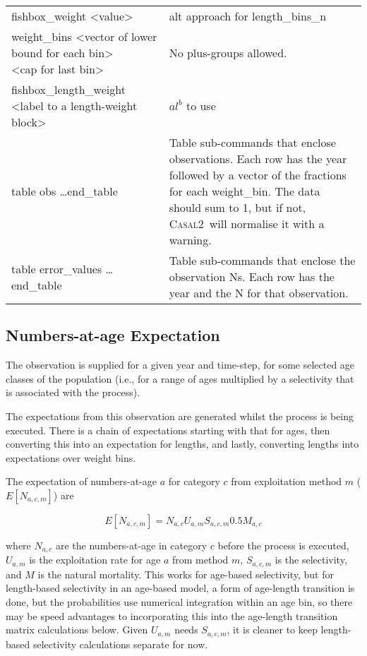 \documentclass[a4paper,11pt,twoside,pdftex,draft]{article}
\newcommand{\CNAME}{\textsc{Casal2}}
\begin{document}
\begin{table}
\begin{tabular}{ll}
fishbox\_weight <value>& alt approach for length\_bins\_n\\

\parbox[t]{0.5\linewidth}{weight\_bins <vector of lower bound for each bin>
	\textcolor{white}{.}~~~~~~ <cap for last bin>}  & No plus-groups allowed.\\

fishbox\_length\_weight <label to a length-weight block>& $al^{b}$ to use\\


table obs   \dots end\_table &  \parbox[t]{0.3\linewidth}{Table sub-commands that enclose observations.
	Each row has the year followed by a vector of the fractions for each weight\_bin.
	The data should sum to 1, but if not, \CNAME~will normalise it with a warning.}\\



table error\_values \dots end\_table   &  \parbox[t]{0.3\linewidth}{Table sub-commands that enclose the observation Ns.
	Each row has the year and the N for that observation.}

\end{tabular}
\end{table}


\subsection{Numbers-at-age Expectation}

The observation is supplied for a given year and time-step, for some selected age classes of the population (i.e., for a range of ages multiplied by a selectivity that is associated with the process).

The expectations from this observation are generated whilst the process is being executed. There is a chain of expectations starting with that for ages, then converting this into an expectation for lengths, and lastly, converting lengths into expectations over weight bins.

The expectation of numbers-at-age $a$ for category $c$ from exploitation method $m$ ($E[N_{a,c,m}]$) are

\begin{equation}
E[N_{a,c,m}] = N_{a,c} U_{a,m} S_{a,c,m} 0.5 M_{a,c}
\end{equation}

where $N_{a,c}$ are the numbers-at-age in category $c$ before the process is executed, $U_{a,m}$ is the exploitation rate for age $a$ from method $m$, $S_{a,c,m}$ is the selectivity, and $M$ is the natural mortality. This works for age-based selectivity, but for length-based selectivity in an age-based model, a form of age-length transition is done, but the probabilities use numerical integration within an age bin, so there may be speed advantages to incorporating this into the age-length transition matrix calculations below. Given $U_{a,m}$ needs $S_{a,c,m} $, it is cleaner to keep length-based selectivity calculations separate for now.
\end{document}
